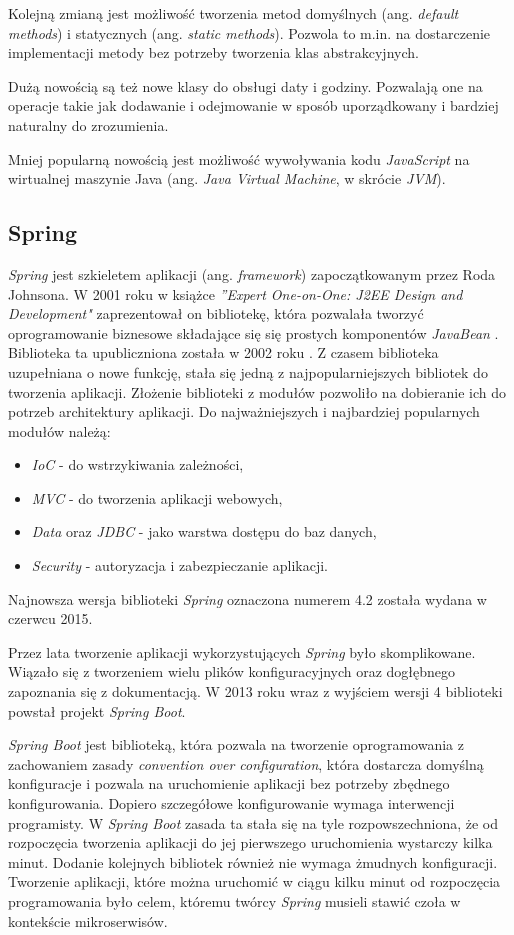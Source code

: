 Kolejną zmianą jest możliwość tworzenia metod domyślnych (ang. \textsl{default methods}) i statycznych (ang. \textsl{static methods}). Pozwola to m.in. na dostarczenie implementacji metody bez potrzeby tworzenia klas abstrakcyjnych.

Dużą nowością są też nowe klasy do obsługi daty i godziny. Pozwalają one na operacje takie jak dodawanie i odejmowanie w sposób uporządkowany i bardziej naturalny do zrozumienia.

Mniej popularną nowością jest możliwość wywoływania kodu \textsl{JavaScript} na wirtualnej maszynie Java (ang. \textsl{Java Virtual Machine}, w skrócie \textsl{JVM}).

\subsection{Spring}
\textsl{Spring} jest szkieletem aplikacji (ang. \textsl{framework}) zapoczątkowanym przez Roda Johnsona. W 2001 roku w  książce \textsl{''Expert One-on-One: J2EE Design and Development"} zaprezentował on bibliotekę, która pozwalała tworzyć oprogramowanie biznesowe składające się się prostych komponentów \textsl{JavaBean} \cite{jeedesign}. Biblioteka ta upubliczniona została  w 2002 roku \cite{springinaction}. Z czasem biblioteka uzupełniana o nowe funkcję, stała się jedną z najpopularniejszych bibliotek do tworzenia aplikacji. Złożenie biblioteki z modułów pozwoliło na dobieranie ich do potrzeb architektury aplikacji. Do najważniejszych i najbardziej popularnych modułów należą:
\begin{itemize}
\item \textsl{IoC} - do wstrzykiwania zależności,
\item \textsl{MVC} - do tworzenia aplikacji webowych,
\item \textsl{Data} oraz \textsl{JDBC} - jako warstwa dostępu do baz danych,
\item \textsl{Security} - autoryzacja i zabezpieczanie aplikacji.
\end{itemize}
Najnowsza wersja biblioteki \textsl{Spring} oznaczona numerem 4.2 została wydana w czerwcu 2015.

Przez lata tworzenie aplikacji wykorzystujących \textsl{Spring} było skomplikowane. Wiązało się z tworzeniem wielu plików konfiguracyjnych oraz dogłębnego zapoznania się z dokumentacją. W 2013 roku wraz z wyjściem wersji 4 biblioteki powstał projekt \textsl{Spring Boot}. 

\textsl{Spring Boot} jest biblioteką, która pozwala na tworzenie oprogramowania z zachowaniem zasady \textsl{convention over configuration}, która dostarcza domyślną konfiguracje i pozwala  na uruchomienie aplikacji bez potrzeby zbędnego konfigurowania.  Dopiero szczegółowe konfigurowanie wymaga interwencji programisty. W \textsl{Spring Boot} zasada ta stała się na tyle rozpowszechniona, że od rozpoczęcia tworzenia aplikacji do jej pierwszego uruchomienia wystarczy kilka minut. Dodanie kolejnych bibliotek również nie wymaga żmudnych konfiguracji. Tworzenie aplikacji, które można uruchomić w ciągu kilku minut od rozpoczęcia programowania było celem, któremu twórcy \textsl{Spring} musieli stawić czoła w kontekście mikroserwisów. 

